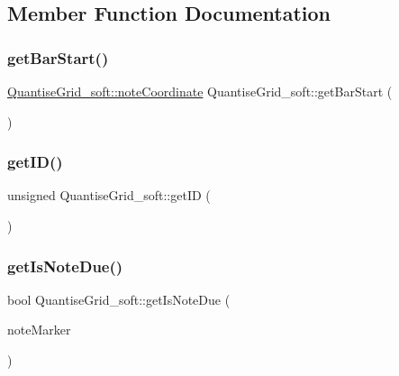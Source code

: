 \subsection{Member Function Documentation}
\mbox{\label{classQuantiseGrid__soft_ae9ba34054f04e9418b2de0a0ce2b4c05}} 
\subsubsection{\texorpdfstring{get\+Bar\+Start()}{getBarStart()}}
{\footnotesize\ttfamily \mbox{\hyperlink{structQuantiseGrid__soft_1_1noteCoordinate}{Quantise\+Grid\+\_\+soft\+::note\+Coordinate}} Quantise\+Grid\+\_\+soft\+::get\+Bar\+Start (\begin{DoxyParamCaption}{ }\end{DoxyParamCaption})}

\mbox{\label{classQuantiseGrid__soft_aa3a80d71734e4a258f226fb8317130fa}} 
\subsubsection{\texorpdfstring{get\+I\+D()}{getID()}}
{\footnotesize\ttfamily unsigned Quantise\+Grid\+\_\+soft\+::get\+ID (\begin{DoxyParamCaption}{ }\end{DoxyParamCaption})}

\mbox{\label{classQuantiseGrid__soft_a2401437abd3a1c44c536cf3a23d16fc6}} 
\subsubsection{\texorpdfstring{get\+Is\+Note\+Due()}{getIsNoteDue()}}
{\footnotesize\ttfamily bool Quantise\+Grid\+\_\+soft\+::get\+Is\+Note\+Due (\begin{DoxyParamCaption}\item[{\mbox{\hyperlink{structQuantiseGrid__soft_1_1noteCoordinate}{Quantise\+Grid\+\_\+soft\+::note\+Coordinate}}}]{note\+Marker }\end{DoxyParamCaption})}

